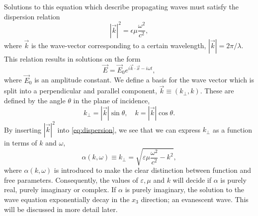 \documentclass[../main.tex]{subfiles}
\begin{document}
Solutions to this equation which describe propagating waves must satisfy the dispersion relation
\begin{equation} \label{eq:dispersion}
    |\vec{k}|^2 = \epsilon\mu \frac{\omega^2}{c^2},
\end{equation}
where $\vec{k}$ is the wave-vector corresponding to a certain wavelength, $|\vec{k}| = 2\pi / \lambda$. This relation results in solutions on the form
\begin{equation}
    \vec{E} = \vec{E}_0e^{i\vec{k}\cdot\vec{x}-i\omega t},
\end{equation}
where $\vec{E}_0$ is an amplitude constant.
We define a basis for the wave vector which is split into a perpendicular and parallel component, $\vec{k} \equiv (k_\perp, k)$. These are defined by the angle $\theta$ in the plane of incidence,
\begin{equation}
        k_\perp = |\vec{k}| \sin \theta, \quad k = |\vec{k}| \cos \theta.
\end{equation}
By inserting $|\vec{k}|^2$ into \autoref{eq:dispersion}, we see that we can express $k_\perp$ as a function in terms of $k$ and $\omega$,
\begin{equation}
     \alpha(k,\omega) \equiv k_\perp  = \sqrt{\varepsilon\mu \frac{\omega^2}{c^2} - k^2},
\end{equation}
where $\alpha(k,\omega)$ is introduced to make the clear distinction between function and free parameters.
Consequently, the values of $\varepsilon, \mu$ and $k$ will decide if $\alpha$ is purely real, purely imaginary or complex. If $\alpha$ is purely imaginary, the solution to the wave equation exponentially decay in the $x_3$ direction; an evanescent wave. This will be discussed in more detail later. 

\end{document}
